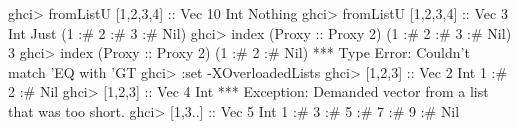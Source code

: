 \documentclass[]{article}
\newenvironment{Shaded}{\begin{snugshade}}{\end{snugshade}}
\newcommand{\CharTok}[1]{\textcolor[rgb]{0.31,0.60,0.02}{#1}}
\newcommand{\DataTypeTok}[1]{\textcolor[rgb]{0.13,0.29,0.53}{#1}}
\newcommand{\DecValTok}[1]{\textcolor[rgb]{0.00,0.00,0.81}{#1}}
\newcommand{\FunctionTok}[1]{\textcolor[rgb]{0.00,0.00,0.00}{#1}}
\newcommand{\NormalTok}[1]{#1}
\newcommand{\OtherTok}[1]{\textcolor[rgb]{0.56,0.35,0.01}{#1}}
\begin{document}
\begin{Shaded}
\begin{Highlighting}[]
\NormalTok{ghci}\FunctionTok{>}\NormalTok{ fromListU [}\DecValTok{1}\NormalTok{,}\DecValTok{2}\NormalTok{,}\DecValTok{3}\NormalTok{,}\DecValTok{4}\NormalTok{]}\OtherTok{ ::} \DataTypeTok{Vec} \DecValTok{10} \DataTypeTok{Int}
\DataTypeTok{Nothing}
\NormalTok{ghci}\FunctionTok{>}\NormalTok{ fromListU [}\DecValTok{1}\NormalTok{,}\DecValTok{2}\NormalTok{,}\DecValTok{3}\NormalTok{,}\DecValTok{4}\NormalTok{]}\OtherTok{ ::} \DataTypeTok{Vec} \DecValTok{3} \DataTypeTok{Int}
\DataTypeTok{Just}\NormalTok{ (}\DecValTok{1} \FunctionTok{:#} \DecValTok{2} \FunctionTok{:#} \DecValTok{3} \FunctionTok{:#} \DataTypeTok{Nil}\NormalTok{)}
\NormalTok{ghci}\FunctionTok{>}\NormalTok{ index (}\DataTypeTok{Proxy}\OtherTok{ ::} \DataTypeTok{Proxy} \DecValTok{2}\NormalTok{) (}\DecValTok{1} \FunctionTok{:#} \DecValTok{2} \FunctionTok{:#} \DecValTok{3} \FunctionTok{:#} \DataTypeTok{Nil}\NormalTok{)}
\DecValTok{3}
\NormalTok{ghci}\FunctionTok{>}\NormalTok{ index (}\DataTypeTok{Proxy}\OtherTok{ ::} \DataTypeTok{Proxy} \DecValTok{2}\NormalTok{) (}\DecValTok{1} \FunctionTok{:#} \DecValTok{2} \FunctionTok{:#} \DataTypeTok{Nil}\NormalTok{)}
\FunctionTok{***} \DataTypeTok{Type} \DataTypeTok{Error}\FunctionTok{:} \DataTypeTok{Couldn't}\NormalTok{ match }\CharTok{'EQ with '}\DataTypeTok{GT}
\NormalTok{ghci}\FunctionTok{>} \FunctionTok{:}\NormalTok{set }\FunctionTok{-}\DataTypeTok{XOverloadedLists}
\NormalTok{ghci}\FunctionTok{>}\NormalTok{ [}\DecValTok{1}\NormalTok{,}\DecValTok{2}\NormalTok{,}\DecValTok{3}\NormalTok{]}\OtherTok{ ::} \DataTypeTok{Vec} \DecValTok{2} \DataTypeTok{Int}
\DecValTok{1} \FunctionTok{:#} \DecValTok{2} \FunctionTok{:#} \DataTypeTok{Nil}
\NormalTok{ghci}\FunctionTok{>}\NormalTok{ [}\DecValTok{1}\NormalTok{,}\DecValTok{2}\NormalTok{,}\DecValTok{3}\NormalTok{]}\OtherTok{ ::} \DataTypeTok{Vec} \DecValTok{4} \DataTypeTok{Int}
\FunctionTok{***} \DataTypeTok{Exception}\FunctionTok{:} \DataTypeTok{Demanded}\NormalTok{ vector from a list that was too short}\FunctionTok{.}
\NormalTok{ghci}\FunctionTok{>}\NormalTok{ [}\DecValTok{1}\NormalTok{,}\DecValTok{3}\FunctionTok{..}\NormalTok{]}\OtherTok{ ::} \DataTypeTok{Vec} \DecValTok{5} \DataTypeTok{Int}
\DecValTok{1} \FunctionTok{:#} \DecValTok{3} \FunctionTok{:#} \DecValTok{5} \FunctionTok{:#} \DecValTok{7} \FunctionTok{:#} \DecValTok{9} \FunctionTok{:#} \DataTypeTok{Nil}
\end{Highlighting}
\end{Shaded}
\end{document}
